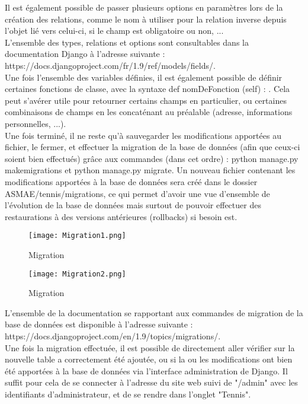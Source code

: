 Il est également possible de passer plusieurs options en paramètres lors de la création des relations, comme le nom à utiliser pour la relation inverse depuis l’objet lié vers celui-ci, si le champ est obligatoire ou non, ...\\

L'ensemble des types, relations et options sont consultables dans la documentation Django à l'adresse suivante : https://docs.djangoproject.com/fr/1.9/ref/models/fields/.\\

Une fois l'ensemble des variables définies, il est également possible de définir certaines fonctions de classe, avec la syntaxe def nomDeFonction (self) : . Cela peut s'avérer utile pour retourner certains champs en particulier, ou certaines combinaisons de champs en les concaténant au préalable (adresse, informations personnelles, ...).\\

Une fois terminé, il ne reste qu'à sauvegarder les modifications apportées au fichier, le fermer, et effectuer la migration de la base de données (afin que ceux-ci soient bien effectués) grâce aux commandes (dans cet ordre) : python manage.py makemigrations et python manage.py migrate. Un nouveau fichier contenant les modifications apportées à la base de données sera créé dans le dossier ASMAE/tennis/migrations, ce qui permet d'avoir une vue d'ensemble de l'évolution de la base de données mais surtout de pouvoir effectuer des restaurations à des versions antérieures (rollbacks) si besoin est.\\

\begin{figure}
\centering
\texttt{[image: Migration1.png]}
\caption{Migration}
\end{figure}

\begin{figure}
\centering
\texttt{[image: Migration2.png]}
\caption{Migration}
\end{figure}

L'ensemble de la documentation se rapportant aux commandes de migration de la base de données est disponible à l'adresse suivante : https://docs.djangoproject.com/en/1.9/topics/migrations/.\\

Une fois la migration effectuée, il est possible de directement aller vérifier sur la nouvelle table a correctement été ajoutée, ou si la ou les modifications ont bien été apportées à la base de données via l'interface administration de Django. Il suffit pour cela de se connecter à l'adresse du site web suivi de "/admin" avec les identifiants d'administrateur, et de se rendre dans l'onglet "Tennis".\\

